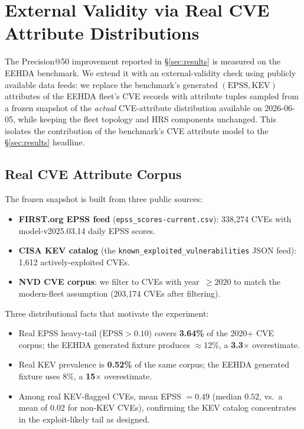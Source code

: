 \section{External Validity via Real CVE Attribute Distributions}
\label{sec:external_validity}

The Precision@50 improvement reported in \S\ref{sec:results} is measured
on the EEHDA benchmark. We extend it with an external-validity
check using publicly available data feeds: we replace the benchmark's
generated $(\mathrm{EPSS}, \mathrm{KEV})$ attributes of the EEHDA fleet's CVE
records with attribute tuples sampled from a frozen snapshot of the
\emph{actual} CVE-attribute distribution available on
2026-06-05, while keeping the fleet topology and HRS components
unchanged. This isolates the contribution of the benchmark's CVE
attribute model to the \S\ref{sec:results} headline.

\subsection{Real CVE Attribute Corpus}

The frozen snapshot is built from three public sources:
\begin{itemize}
\item \textbf{FIRST.org EPSS feed} (\texttt{epss\_scores-current.csv}):
338{,}274 CVEs with model-v2025.03.14 daily EPSS scores.
\item \textbf{CISA KEV catalog} (the
\texttt{known\_exploited\_vulnerabilities} JSON feed):
1{,}612 actively-exploited CVEs.
\item \textbf{NVD CVE corpus}: we filter to CVEs with year~$\geq 2020$ to
match the modern-fleet assumption (203{,}174 CVEs after filtering).
\end{itemize}

Three distributional facts that motivate the experiment:
\begin{itemize}
\item Real EPSS heavy-tail ($\mathrm{EPSS} > 0.10$) covers
\textbf{3.64\%} of the 2020+ CVE corpus; the EEHDA generated fixture
produces $\approx$12\%, a \textbf{3.3$\times$} overestimate.
\item Real KEV prevalence is \textbf{0.52\%} of the same corpus;
the EEHDA generated fixture uses 8\%, a \textbf{15$\times$}
overestimate.
\item Among real KEV-flagged CVEs, mean EPSS $= 0.49$ (median $0.52$,
vs.\ a mean of $0.02$ for non-KEV CVEs), confirming the KEV catalog
concentrates in the exploit-likely tail as designed.
\end{itemize}

